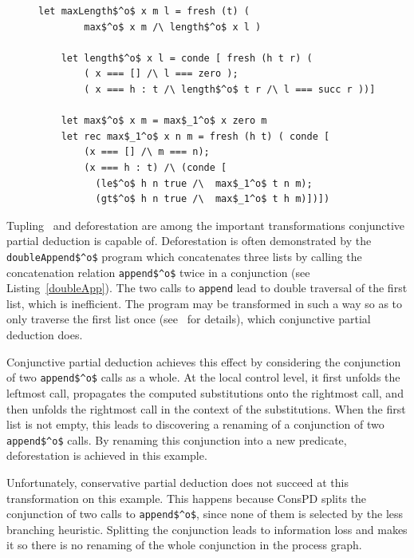 \begin{figure}[!t]
  \centering
  \begin{minipage}{0.7\textwidth}
    \begin{lstlisting}[label={maxlen}, caption={Inefficient implementation of maxLength$^o$}, captionpos=b, frame=tb]
    let maxLength$^o$ x m l = fresh (t) (
        max$^o$ x m /\ length$^o$ x l )

    let length$^o$ x l = conde [ fresh (h t r) (
        ( x === [] /\ l === zero );
        ( x === h : t /\ length$^o$ t r /\ l === succ r ))]

    let max$^o$ x m = max$_1^o$ x zero m
    let rec max$_1^o$ x n m = fresh (h t) ( conde [
        (x === [] /\ m === n);
        (x === h : t) /\ (conde [
          (le$^o$ h n true /\  max$_1^o$ t n m);
          (gt$^o$ h n true /\  max$_1^o$ t h m)])])
    \end{lstlisting}
  \end{minipage}
\end{figure}

Tupling~\cite{pettorossi1984powerful, chin1993towards} and deforestation are among the important transformations conjunctive partial deduction is capable of.
Deforestation is often demonstrated by the \lstinline{doubleAppend$^o$} program which concatenates three lists by calling the concatenation relation \lstinline{append$^o$} twice in a conjunction (see Listing~\ref{doubleApp}).
The two calls to \lstinline{append} lead to double traversal of the first list, which is inefficient.
The program may be transformed in such a way so as to only traverse the first list once (see~\cite{de1999conjunctive} for details), which conjunctive partial deduction does.

Conjunctive partial deduction achieves this effect by considering the conjunction of two \lstinline{append$^o$} calls as a whole.
At the local control level, it first unfolds the leftmost call, propagates the computed substitutions onto the rightmost call, and then unfolds the rightmost call in the context of the substitutions.
When the first list is not empty, this leads to discovering a renaming of a conjunction of two \lstinline{append$^o$} calls.
By renaming this conjunction into a new predicate, deforestation is achieved in this example.

Unfortunately, conservative partial deduction does not succeed at this transformation on this example.
This happens because ConsPD splits the conjunction of two calls to \lstinline{append$^o$}, since none of them is selected by the less branching heuristic.
Splitting the conjunction leads to information loss and makes it so there is no renaming of the whole conjunction in the process graph.

